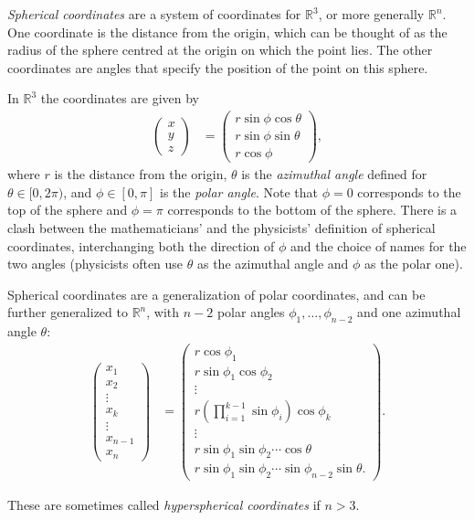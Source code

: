\documentclass[12pt]{article}
\newcommand{\mb}{\mathbb}
\newcommand{\R}{\mb{R}}
\newcommand{\<}{\langle}
\renewcommand{\>}{\rangle}
\begin{document}

\emph{Spherical coordinates} are a system of coordinates for $\R^3$,
or more generally $\R^n$.
One coordinate is the distance from the origin,
which can be thought of as
the radius of the sphere centred at the origin on which the point lies.
The other coordinates are angles that specify the position of the point on this sphere.

In $\R^3$ the coordinates are given by
\begin{align*}
\left(
\begin{array}{c}
x\\
y\\
z
\end{array}\right) &=
\left(
\begin{array}{c}
r\sin\phi\cos\theta\\
r\sin\phi\sin\theta\\
r\cos\phi
\end{array}
\right),
\end{align*}
where $r$ is the distance from the origin,
$\theta$ is the \emph{azimuthal angle} defined for $\theta\in[0,2\pi)$,
and $\phi\in[0,\pi]$ is the \emph{polar angle}.
Note that $\phi=0$ corresponds to the top of the sphere and $\phi=\pi$ corresponds to the bottom of the sphere.
There is a clash between the mathematicians' and the physicists' definition of spherical coordinates, interchanging both the direction of $\phi$ and the choice of names for the two angles (physicists often use $\theta$ as the azimuthal angle and $\phi$ as the polar one).

Spherical coordinates are a generalization of polar coordinates,
and can be further generalized to $\R^n$,
with $n-2$ polar angles $\phi_1,\ldots,\phi_{n-2}$ and one azimuthal angle $\theta$:
\begin{align*}
\left(
\begin{array}{c}
x_1\\
x_2\\
\vdots\\
x_k\\
\vdots\\
x_{n-1}\\
x_n
\end{array}\right)&=
\left(
\begin{array}{c}
r\cos\phi_1\\
r\sin\phi_1\cos\phi_2\\
\vdots\\
r\left(\prod_{i=1}^{k-1}\sin\phi_i\right)\cos\phi_k\\
\vdots\\
r\sin\phi_1\sin\phi_2\cdots\cos\theta\\
r\sin\phi_1\sin\phi_2\cdots\sin\phi_{n-2}\sin\theta.
\end{array}
\right).
\end{align*}

These are sometimes called \emph{hyperspherical coordinates} if $n>3$.
\end{document}
